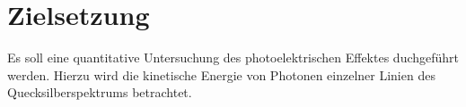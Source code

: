 
\section{Zielsetzung}
\label{sec:Zielsetzung}
Es soll eine quantitative Untersuchung des photoelektrischen Effektes duchgeführt werden.
Hierzu wird die kinetische Energie von Photonen einzelner Linien des Quecksilberspektrums
betrachtet.
